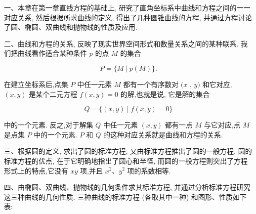 \documentclass[lang=cn,newtx,10pt,scheme=chinese]{elegantbook}
\begin{document}
一、本章在第一章直线方程的基础上, 研究了直角坐标系中曲线和方程之间的一一对应关系, 然后根据所求曲线的定义, 得出了几种圆锥曲线的方程, 并通过方程讨论了圆、椭圆、双曲线和抛物线的性质及应用.

二、曲线和方程的关系, 反映了现实世界空间形式和数量关系之间的某种联系. 我们把曲线看作适合某种条件 \(p\) 的点 \(M\) 的集合

\[
  P = \{ M \mid p\left( M\right) \} .
\]

在建立坐标系后,点集 \(P\) 中任一元素 \(M\) 都有一个有序数对 \((x\) , \(y)\) 和它对应, \(\left( {x,y}\right)\) 是某个二元方程 \(f\left( {x,y}\right) = 0\) 的解,也就是说, 它是解的集合

\[
  Q = \{ \left( {x,y}\right) \mid f\left( {x,y}\right) = 0\}
\]

中的一个元素. 反之,对于解集 \(Q\) 中任一元素 \(\left( {x,y}\right)\) 都有一点 \(M\) 与它对应,点 \(M\) 是点集 \(P\) 中的一个元素. \(P\) 和 \(Q\) 的这种对应关系就是曲线和方程的关系.

三、根据圆的定义, 求出了圆的标准方程, 又由标准方程推出了圆的一般方程. 圆的标准方程的优点, 在于它明确地指出了圆心和半径, 而圆的一般方程则突出了方程形式上的特点,它没有 \({xy}\) 项,并且 \({x}^{2}\text{、}{y}^{2}\) 项的系数相等.

四、由椭圆、双曲线、抛物线的几何条件求其标准方程, 并通过分析标准方程研究这三种曲线的几何性质. 三种曲线的标准方程 (各取其中一种) 和图形、性质如下表:
\end{document}
